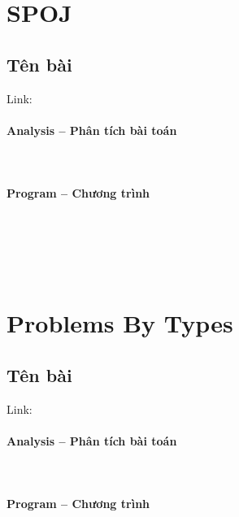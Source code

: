\documentclass{article}
\begin{document}
\section{SPOJ}

\subsection{Tên bài}
Link: \url{}
 

\paragraph{Analysis -- Phân tích bài toán} \mbox{} \\


\paragraph{Program -- Chương trình} \mbox{} \\


\begin{lstlisting}

	
\end{lstlisting}

\section{Problems By Types}

\subsection{Tên bài}
Link: \url{}
 

\paragraph{Analysis -- Phân tích bài toán} \mbox{} \\


\paragraph{Program -- Chương trình} \mbox{} \\


\begin{lstlisting}

	
\end{lstlisting}
\end{document}

